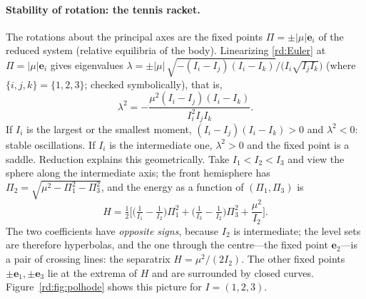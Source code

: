 \paragraph{Stability of rotation: the tennis racket.} The rotations about the principal axes are the fixed points $\Pi=\pm|\mu|\mathbf e_i$ of the reduced system (relative equilibria of the body). Linearizing \eqref{rd:Euler} at $\Pi=|\mu|\mathbf e_i$ gives eigenvalues $\lambda=\pm|\mu|\,\sqrt{-(I_i-I_j)(I_i-I_k)}\big/\big(I_i\sqrt{I_jI_k}\big)$ (where $\{i,j,k\}=\{1,2,3\}$; checked symbolically), that is,
\[
\lambda^2=-\frac{\mu^2(I_i-I_j)(I_i-I_k)}{I_i^2I_jI_k}.
\]
If $I_i$ is the largest or the smallest moment, $(I_i-I_j)(I_i-I_k)>0$ and $\lambda^2<0$: stable oscillations. If $I_i$ is the intermediate one, $\lambda^2>0$ and the fixed point is a saddle. Reduction explains this geometrically. Take $I_1<I_2<I_3$ and view the sphere along the intermediate axis; the front hemisphere has $\Pi_2=\sqrt{\mu^2-\Pi_1^2-\Pi_3^2}$, and the energy as a function of $(\Pi_1,\Pi_3)$ is
\begin{equation}\label{rd:Eproj}
H=\tfrac12\Big[\Big(\tfrac1{I_1}-\tfrac1{I_2}\Big)\Pi_1^2+\Big(\tfrac1{I_3}-\tfrac1{I_2}\Big)\Pi_3^2+\frac{\mu^2}{I_2}\Big].
\end{equation}
The two coefficients have \emph{opposite signs}, because $I_2$ is intermediate; the level sets are therefore hyperbolas, and the one through the centre---the fixed point $\mathbf e_2$---is a pair of crossing lines: the separatrix $H=\mu^2/(2I_2)$. The other fixed points $\pm\mathbf e_1,\pm\mathbf e_3$ lie at the extrema of $H$ and are surrounded by closed curves. Figure~\ref{rd:fig:polhode} shows this picture for $I=(1,2,3)$.

